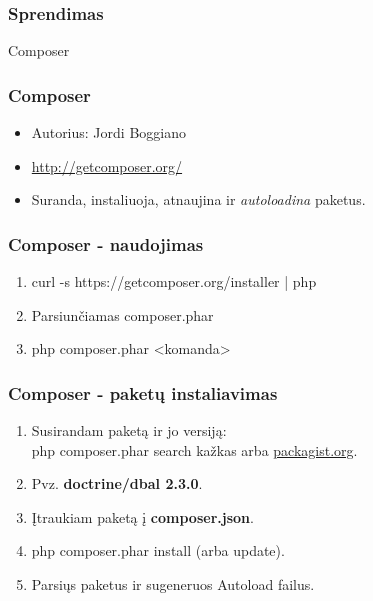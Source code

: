 \documentclass[12pt,a4paper]{beamer}
\begin{document}
\begin{frame}[fragile]
    \frametitle{Sprendimas}

    {\Huge Composer}
\end{frame}

\begin{frame}
    \frametitle{Composer}

    \begin{itemize}
        \item Autorius: Jordi Boggiano
        \item \url{http://getcomposer.org/}
        \item Suranda, instaliuoja, atnaujina ir \textit{autoloadina} paketus.
    \end{itemize}
\end{frame}

\begin{frame}
    \frametitle{Composer - naudojimas}
        \begin{enumerate}
            \item curl -s https://getcomposer.org/installer | php 
            \item Parsiunčiamas {\color{orange}composer.phar}
            \item {\color{orange}php composer.phar <komanda>}
        \end{enumerate}
\end{frame}

\begin{frame}
    \frametitle{Composer - paketų instaliavimas}

    \begin{enumerate}
        \item Susirandam paketą ir jo versiją:\\{\color{orange}php composer.phar search kažkas} arba \url{packagist.org}.
        \item Pvz. \textbf{doctrine/dbal 2.3.0}.
        \item Įtraukiam paketą į \textbf{composer.json}.
        \item {\color{orange}php composer.phar install} (arba {\color{orange}update}).
        \item Parsiųs paketus ir sugeneruos Autoload failus.
    \end{enumerate}
\end{frame}
\end{document}
